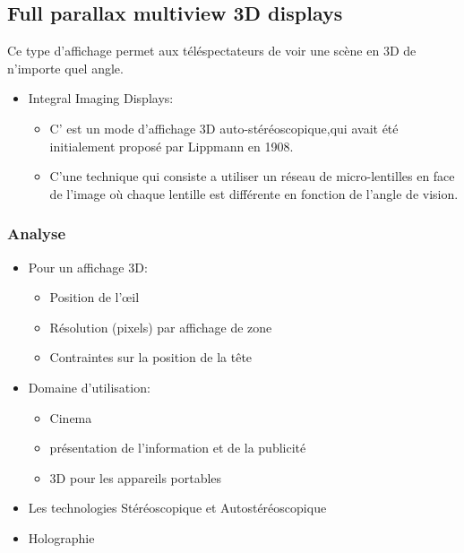 \subsection{Full parallax multiview 3D displays} 
\begin{frame}
  
  Ce type d’affichage permet aux téléspectateurs de voir une scène en 3D de n'importe quel angle.\\
  
  \begin{itemize}
  \item Integral Imaging Displays:
    
    \begin{itemize}
    \item C’ est un mode d'affichage 3D auto-stéréoscopique,qui avait été initialement proposé par Lippmann en 1908.

    \item C’une technique qui consiste a utiliser un réseau de micro-lentilles en face de l’image où chaque lentille est différente en fonction de l'angle de vision.

    \end{itemize}
  \end{itemize}
  
\end{frame}
\begin{frame}
  \frametitle{Analyse} 
  
  \begin{itemize}
  \item Pour un affichage 3D:
    \begin{itemize}
    \item Position de l’œil
    \item Résolution (pixels) par affichage de zone
    \item Contraintes sur la position de la tête
    \end{itemize}
  \end{itemize}

  \begin{itemize}
  \item Domaine d’utilisation:
    \begin{itemize}
    \item Cinema
    \item présentation de l'information et de la publicité
    \item 3D pour les appareils portables
    \end{itemize}
  \end{itemize}
  \begin{itemize}
  \item Les technologies Stéréoscopique et Autostéréoscopique
  \item Holographie
  \end{itemize}
\end{frame}


